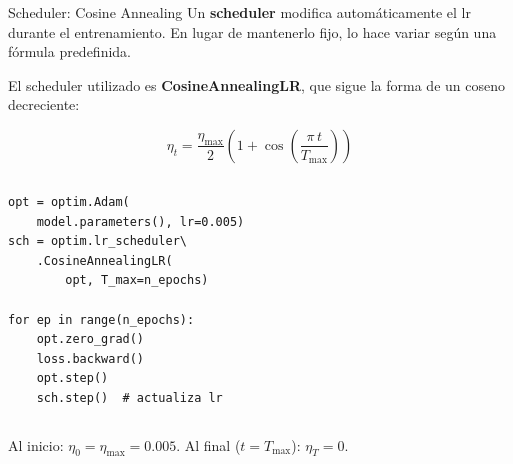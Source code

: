 \documentclass[10pt]{beamer}
\begin{document}
\begin{frame}[fragile]{Scheduler: Cosine Annealing}
\small
Un \textbf{scheduler} modifica automáticamente el lr durante el entrenamiento. En lugar de mantenerlo fijo, lo hace variar según una fórmula predefinida.

\medskip
El scheduler utilizado es \textbf{CosineAnnealingLR}, que sigue la forma de un coseno decreciente:

\[
  \eta_t = \frac{\eta_{\max}}{2}\left(1 + \cos\!\left(\frac{\pi\, t}{T_{\max}}\right)\right)
\]

\begin{columns}


\begin{lstlisting}[style=python]
opt = optim.Adam(
    model.parameters(), lr=0.005)
sch = optim.lr_scheduler\
    .CosineAnnealingLR(
        opt, T_max=n_epochs)

for ep in range(n_epochs):
    opt.zero_grad()
    loss.backward()
    opt.step()
    sch.step()  # actualiza lr
\end{lstlisting}
\end{columns}

\smallskip
Al inicio: $\eta_0 = \eta_{\max} = 0.005$. Al final ($t = T_{\max}$): $\eta_{T} = 0$.

\end{frame}
\end{document}
